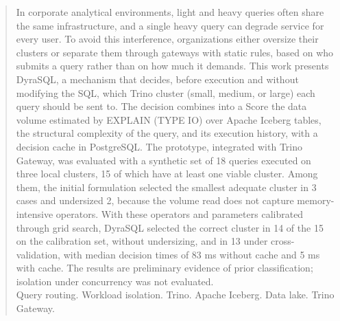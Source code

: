\begin{abstract}
\noindent
In corporate analytical environments, light and heavy queries often share the same infrastructure, and a single heavy query can degrade service for every user. To avoid this interference, organizations either oversize their clusters or separate them through gateways with static rules, based on who submits a query rather than on how much it demands. This work presents DyraSQL, a mechanism that decides, before execution and without modifying the SQL, which Trino cluster (small, medium, or large) each query should be sent to. The decision combines into a Score the data volume estimated by EXPLAIN (TYPE IO) over Apache Iceberg tables, the structural complexity of the query, and its execution history, with a decision cache in PostgreSQL. The prototype, integrated with Trino Gateway, was evaluated with a synthetic set of 18 queries executed on three local clusters, 15 of which have at least one viable cluster. Among them, the initial formulation selected the smallest adequate cluster in 3 cases and undersized 2, because the volume read does not capture memory-intensive operators. With these operators and parameters calibrated through grid search, DyraSQL selected the correct cluster in 14 of the 15 on the calibration set, without undersizing, and in 13 under cross-validation, with median decision times of 83 ms without cache and 5 ms with cache. The results are preliminary evidence of prior classification; isolation under concurrency was not evaluated.
\\\textbf{} Query routing. Workload isolation. Trino. Apache Iceberg. Data lake. Trino Gateway.
\end{abstract}
